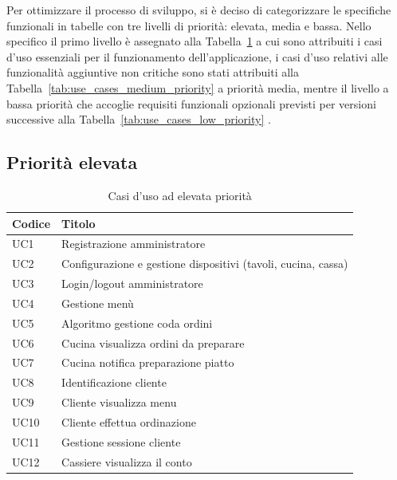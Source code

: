Per ottimizzare il processo di sviluppo, si è deciso di categorizzare le specifiche funzionali in tabelle con tre livelli di priorità: elevata, media e bassa. Nello specifico il primo livello è assegnato alla Tabella~\ref{tab:use_cases_high_priority} a cui sono attribuiti i casi d'uso essenziali per il funzionamento dell'applicazione, i casi d'uso relativi alle funzionalità aggiuntive non critiche sono stati attribuiti alla Tabella~\ref{tab:use_cases_medium_priority} a priorità media, mentre il livello a bassa priorità che accoglie requisiti funzionali opzionali previsti per versioni successive alla Tabella~\ref{tab:use_cases_low_priority} .

\clearpage
\subsection{Priorità elevata}

\begin{table}[htbp]
	\centering
	 \begin{tabularx}{\textwidth}{|>{\centering\arraybackslash} m{4em}| >{\raggedright\arraybackslash}X |}
		\hline
		\textbf{Codice} & \textbf{Titolo} \\ [0.5ex]
		\hline\hline
		UC1 & Registrazione amministratore  \\
		\hline
		UC2 & Configurazione e gestione dispositivi (tavoli, cucina, cassa) \\
		\hline
		UC3 & Login/logout amministratore \\
		\hline
		UC4 & Gestione menù \\
		\hline
		UC5 & Algoritmo gestione coda ordini \\
		\hline
		UC6 & Cucina visualizza ordini da preparare \\
		\hline
		UC7 & Cucina notifica preparazione piatto \\
		\hline
		UC8 & Identificazione cliente \\
		\hline
		UC9 & Cliente visualizza menu \\
		\hline
		UC10 & Cliente effettua ordinazione \\
		\hline
		UC11 & Gestione sessione cliente \\
		\hline
		UC12 & Cassiere visualizza il conto \\
		\hline
	\end{tabularx}
	\caption{Casi d'uso ad elevata priorità}
	\label{tab:use_cases_high_priority}
\end{table}

